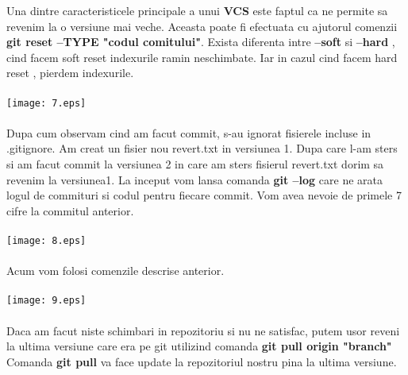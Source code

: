 \tab Una dintre caracteristicele principale a unui \textbf{VCS} este faptul ca
ne permite sa revenim la o versiune mai veche. Aceasta poate fi efectuata cu ajutorul
comenzii \textbf{git reset --TYPE "codul comitului"}. Exista diferenta intre 
\textbf{--soft} si \textbf{--hard} , cind facem soft reset indexurile ramin neschimbate.
Iar in cazul cind facem hard reset , pierdem indexurile.
\\
\\
\texttt{[image: 7.eps]}
\\
\\
Dupa cum observam cind am facut commit, s-au ignorat fisierele incluse in .gitignore.
\clearpage
\tab Am creat un fisier nou revert.txt in versiunea 1. Dupa care l-am sters si am facut
commit la versiunea 2 in care am sters fisierul revert.txt dorim sa revenim la versiunea1. La inceput vom lansa comanda \textbf{git --log} care ne arata logul de commituri si
codul pentru fiecare commit. Vom avea nevoie de primele 7 cifre la commitul anterior.\\
\\
\texttt{[image: 8.eps]}\\
\\
Acum vom folosi comenzile descrise anterior.\\
\\
\texttt{[image: 9.eps]}\\
\\
Daca am facut niste schimbari in repozitoriu si nu ne satisfac, putem usor reveni
la ultima versiune care era pe git utilizind comanda \textbf{git pull origin "branch"}\\
Comanda \textbf{git pull} va face update la repozitoriul nostru pina la ultima versiune.
